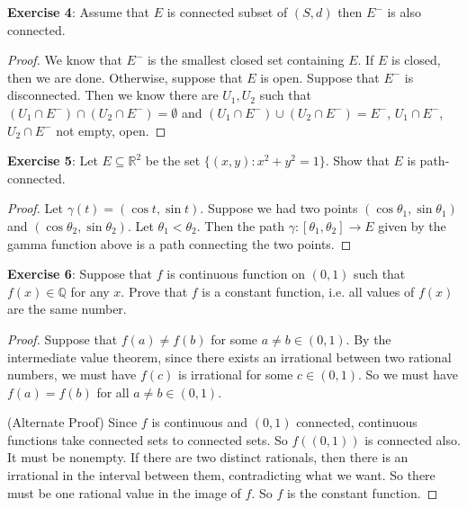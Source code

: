 \documentclass{article}
\begin{document}
\textbf{Exercise 4}: Assume that $E$ is connected subset of $(S, d)$ then $E^{-}$ is also connected.
    \begin{proof}
        We know that $E^{-}$ is the smallest closed set containing $E$. If $E$ is closed, then we are done. Otherwise, suppose that $E$ is open. Suppose that $E^{-}$ is disconnected. Then we know there are $U_{1}, U_{2}$ such that $(U_{1} \cap E^{-}) \cap (U_{2} \cap E^{-}) = \emptyset$ and $(U_{1} \cap E^{-}) \cup (U_{2} \cap E^{-}) = E^{-}$, $U_{1} \cap E^{-}$, $U_{2} \cap E^{-}$ not empty, open.
    \end{proof}

\textbf{Exercise 5}: Let $E \subseteq \mathbb{R}^{2}$ be the set $\{(x, y) : x^{2} + y^{2} = 1\}$. Show that $E$ is path-connected.
    \begin{proof}
        Let $\gamma (t) = (\cos{t}, \sin{t})$. Suppose we had two points $(\cos{ \theta_{1}}, \sin{\theta_{1}})$ and $(\cos{\theta_{2}}, \sin{\theta_{2}})$. Let $\theta_{1} < \theta_{2}$. Then the path $\gamma: [\theta_{1}, \theta_{2}] \rightarrow E$ given by the gamma function above is a path connecting the two points.
    \end{proof}

\textbf{Exercise 6}: Suppose that $f$ is continuous function on $(0, 1)$ such that $f(x) \in \mathbb{Q}$ for any $x$. Prove that $f$ is a constant function, i.e. all values of $f(x)$ are the same number.
    \begin{proof}
        Suppose that $f(a) \neq f(b)$ for some $a \neq b \in (0, 1)$. By the intermediate value theorem, since there exists an irrational between two rational numbers, we must have $f(c)$ is irrational for some $c \in (0, 1)$. So we must have $f(a) = f(b)$ for all $a \neq b \in (0, 1)$.

        (Alternate Proof) Since $f$ is continuous and $(0, 1)$ connected, continuous functions take connected sets to connected sets. So $f((0, 1))$ is connected also. It must be nonempty. If there are two distinct rationals, then there is an irrational in the interval between them, contradicting what we want. So there must be one rational value in the image of $f$. So $f$ is the constant function.
    \end{proof}
\end{document}
